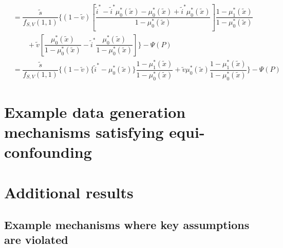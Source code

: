 \begin{appendix}
\begin{align*}
   &=\dfrac{\widetilde s}{f_{S,V}(1, 1)}  \bigg\{(1 - \widetilde v) \left[ \dfrac{\widetilde i^* - \widetilde i^* \mu^*_0(\widetilde x) - \mu^*_0(\widetilde x) + \widetilde i^* \mu^*_0(\widetilde x)}{1 - \mu^*_0(\widetilde x)}\right]\dfrac{1 - \mu^*_1(\widetilde x)}{1 - \mu^*_0(\widetilde x)} \\
   &\qquad + \widetilde v \left[\dfrac{\mu^*_0(\widetilde x)}{1 - \mu^*_0(\widetilde x)} - \widetilde i^* \dfrac{\mu^*_0(\widetilde x)}{1 - \mu^*_0(\widetilde x)}\right]   \bigg\}  - \Psi(P) \\
   &=\dfrac{\widetilde s}{f_{S,V}(1, 1)}  \bigg\{(1 - \widetilde v) \{\widetilde i^* - \mu^*_0(\widetilde x)\}\dfrac{1 - \mu^*_1(\widetilde x)}{1 - \mu^*_0(\widetilde x)} + \widetilde v \mu^*_0(\widetilde x) \dfrac{1 - \mu^*_1(\widetilde x)}{1 - \mu^*_0(\widetilde x)}  \bigg\}  - \Psi(P) 
\end{align*}
    \newpage
    
    \section{Example data generation mechanisms satisfying equi-confounding}

    \newpage
    
    \section{Additional results}
    \subsection{Example mechanisms where key assumptions are violated}
    
    \begin{figure}[p]
    \centering
    \begin{subfigure}{0.8\linewidth}
        \centering
\end{subfigure}
\end{figure}
\end{appendix}
